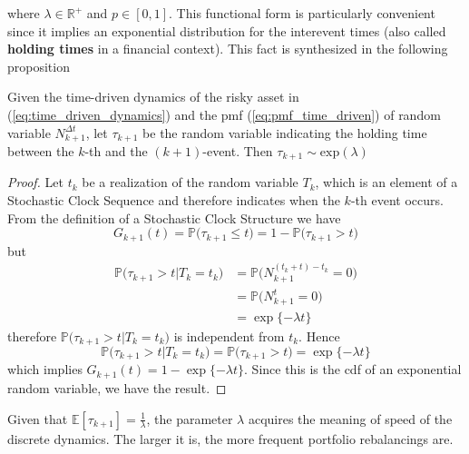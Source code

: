 where $\lambda \in \mathbb{R}^{+}$ and $p \in [0,1]$. This functional form is particularly convenient since it implies an exponential distribution for the interevent times (also called \textbf{holding times} in a financial context). This fact is synthesized in the following proposition
\begin{proposition}\label{prop:tau_distribution}
	Given the time-driven dynamics of the risky asset in (\ref{eq:time_driven_dynamics}) and the pmf (\ref{eq:pmf_time_driven}) of random variable $N^{\Delta t}_{k+1}$, let $\tau_{k+1}$ be the random variable indicating the holding time between the $k$-th and the $(k+1)$-event.
	Then $\tau_{k+1} \sim \text{exp}(\lambda)$
\end{proposition}
\begin{proof}
	Let $t_k$ be a realization of the random variable $T_k$, which is an element of a Stochastic Clock Sequence and therefore indicates when the $k$-th event occurs. From the definition of a Stochastic Clock Structure we have
	\[
	G_{k+1}(t)= \mathbb{P}\big(\tau_{k+1}\leq t\big) = 1 - \mathbb{P}\big(\tau_{k+1}> t\big)
	\]
	but 
	\begin{align*}
	\mathbb{P}\big(\tau_{k+1}>t \lvert T_k = t_k\big) &= \mathbb{P}\big(N^{(t_k+t)-t_k}_{k+1}=0\big)\\
	& =\mathbb{P}\big(N^{t}_{k+1}=0\big)  \\
	& = \exp\{-\lambda t \}
	\end{align*}
	therefore $\mathbb{P}\big(\tau_{k+1}>t \lvert T_k = t_k\big)$ is independent from $t_k$. Hence 
	\[
	\mathbb{P}\big(\tau_{k+1}>t \lvert T_k = t_k\big) = \mathbb{P}\big(\tau_{k+1}> t\big) = \exp\{-\lambda t \} 
	\]
	which implies $G_{k+1}(t)=1-\exp\{-\lambda t \}$. Since this is the cdf of an exponential random variable, we have the result.
\end{proof}
\begin{remark}
	Given that $\mathbb{E}[\tau_{k+1}]=\frac{1}{\lambda}$, the parameter $\lambda$ acquires the meaning of speed of the discrete dynamics. The larger it is, the more frequent portfolio rebalancings are.
\end{remark}
